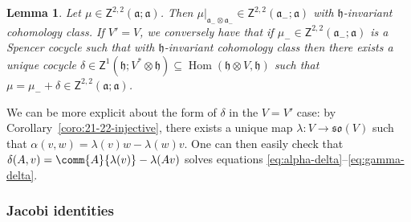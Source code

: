 \documentclass[pdftex]{sigma}
\numberwithin{equation}{section}
\newtheorem{Lemma}[Theorem]{Lemma}
\newcommand{\fa}{\mathfrak{a}}
\newcommand{\fh}{\mathfrak{h}}
\newcommand{\fso}{\mathfrak{so}}
\newcommand{\ssZ}{\mathsf{Z}}
\newcommand{\1}{\mathbbm{1}}
\DeclareMathOperator{\Hom}{Hom}
\begin{document}
\begin{Lemma}\label{lemma:invt-spencer-cocycle}
	Let $\mu\in\ssZ^{2,2}(\fa;\fa)$. Then $\mu|_{\fa_-\otimes\fa_-}\in\ssZ^{2,2}(\fa_-;\fa)$ with $\fh$-invariant cohomology class. If $V'=V$, we conversely have that if $\mu_-\in\ssZ^{2,2}(\fa_-;\fa)$ is a Spencer cocycle such that with $\fh$-invariant cohomology class then there exists a unique cocycle $\delta\in\ssZ^1(\fh;V^*\otimes\fh)\subseteq\Hom(\fh\otimes V,\fh)$ such that $\mu=\mu_-+\delta\in\ssZ^{2,2}(\fa;\fa)$.
\end{Lemma}

We can be more explicit about the form of $\delta$ in the $V=V'$ case: by Corollary~\ref{coro:21-22-injective}, there exists a unique map $\lambda\colon V\to\fso(V)$ such that
$\alpha(v,w) = \lambda(v)w - \lambda(w)v$.
One can then easily check that
$\delta(A,v) = \comm{A}{\lambda(v)} - \lambda(Av)
$
solves equations \eqref{eq:alpha-delta}--\eqref{eq:gamma-delta}.

\subsubsection{Jacobi identities}
\end{document}
